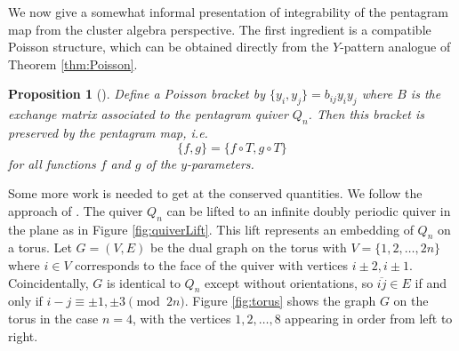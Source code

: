 \documentclass{amsart}
\newtheorem{proposition}[theorem]{Proposition}
\theoremstyle{definition}
\theoremstyle{remark}
\numberwithin{equation}{section}
\begin{document}
	We now give a somewhat informal presentation of integrability of the pentagram map from the cluster algebra perspective.  The first ingredient is a compatible Poisson structure, which can be obtained directly from the $Y$-pattern analogue of Theorem \ref{thm:Poisson}.
	
	\begin{proposition}[\cite{OST10, GSTV12}] \label{prop:pentagramBracket}
		Define a Poisson bracket by $\{y_i,y_j\} = b_{ij}y_iy_j$ where $B$ is the exchange matrix associated to the pentagram quiver $Q_n$.  Then this bracket is preserved by the pentagram map, i.e.
		\begin{displaymath}
			\{f,g\} = \{f\circ T, g \circ T\}
		\end{displaymath}
		for all functions $f$ and $g$ of the $y$-parameters.
	\end{proposition}
	
	Some more work is needed to get at the conserved quantities.  We follow the approach of \cite{GK13}.  The quiver $Q_n$ can be lifted to an infinite doubly periodic quiver in the plane as in Figure \ref{fig:quiverLift}.  This lift represents an embedding of $Q_n$ on a torus.  Let $G = (V,E)$ be the dual graph on the torus with $V = \{1,2,\ldots, 2n\}$ where $i \in V$ corresponds to the face of the quiver with vertices $i \pm 2, i \pm 1$.  Coincidentally, $G$ is identical to $Q_n$ except without orientations, so $\overline{ij} \in E$ if and only if $i-j \equiv \pm 1, \pm 3 \pmod{2n}$.  Figure \ref{fig:torus} shows the graph $G$ on the torus in the case $n=4$, with the vertices $1,2,\ldots, 8$ appearing in order from left to right.
	
\end{document}
